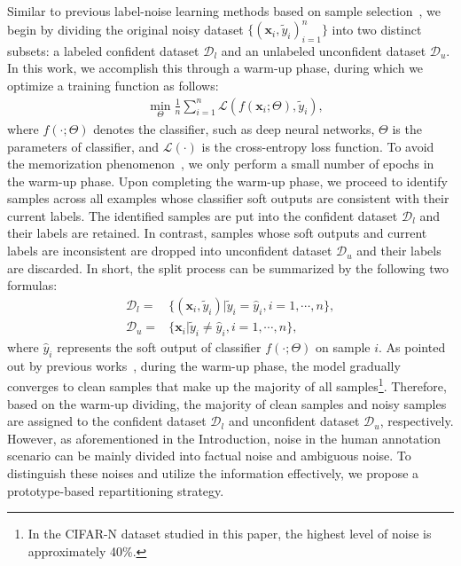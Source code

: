 \documentclass[letterpaper]{article} %
\begin{document}
Similar to previous label-noise learning methods based on sample selection~\cite{DBLP:journals/corr/abs-2303-10802, DBLP:journals/corr/abs-2007-08199, DBLP:conf/iclr/WeiZ0L0022}, we begin by dividing the original noisy dataset $\{({\bm{x}_{i}, \tilde{y}_{i}})_{i = 1}^{n}\}$ into two distinct subsets: a labeled confident dataset $\mathcal{D}_{l}$ and an unlabeled unconfident dataset $\mathcal{D}_{u}$. In this work, we accomplish this through a warm-up phase, during which we optimize a training function as follows:
\begin{align}
& \min_{\Theta}\frac{1}{n}\sum_{i = 1}^{n}\mathcal{L}(f(\bm{x}_{i};\Theta), {\tilde{y}_{i}}),
\label{equ:warm_up}
\end{align}
where $f(\cdot; \Theta)$ denotes the classifier, such as deep neural networks, $\Theta$ is the parameters of classifier, and $\mathcal{L(\cdot)}$ is the cross-entropy loss function. To avoid the memorization phenomenon~\cite{DBLP:conf/icml/ArpitJBKBKMFCBL17}, we only perform a small number of epochs in the warm-up phase. Upon completing the warm-up phase, we proceed to identify samples across all examples whose classifier soft outputs are consistent with their current labels. The identified samples are put into the confident dataset $\mathcal{D}_{l}$ and their labels are retained. In contrast, samples whose soft outputs and current labels are inconsistent are dropped into unconfident dataset $\mathcal{D}_{u}$ and their labels are discarded. In short, the split process can be summarized by the following two formulas:
\begin{align}
    \mathcal{D}_{l} = & \{({\bm{x}_{i}, \tilde{y}_{i}})|\tilde{y}_{i} = \hat{y}_i, i = 1, \cdots, n\},\label{equ:conf}\\
    \mathcal{D}_{u} = & \{\bm{x}_{i}| \tilde{y}_{i} \neq \hat{y}_i, i = 1, \cdots, n\}\label{equ:unconf},
\end{align}
where $\hat{y}_i$ represents the soft output of classifier $f(\cdot; \Theta)$ on sample $i$. As pointed out by previous works~\cite{DBLP:conf/nips/BaiYHYLMNL21}, during the warm-up phase, the model gradually converges to clean samples that make up the majority of all samples\footnote{In the CIFAR-N dataset studied in this paper, the highest level of noise is approximately 40\%.}. Therefore, based on the warm-up dividing, the majority of clean samples and noisy samples are assigned to the confident dataset $\mathcal{D}_{l}$ and unconfident dataset $\mathcal{D}_{u}$, respectively. However, as aforementioned in the Introduction, noise in the human annotation scenario can be mainly divided into factual noise and ambiguous noise. To distinguish these noises and utilize the information effectively, we propose a prototype-based repartitioning strategy.
\end{document}
